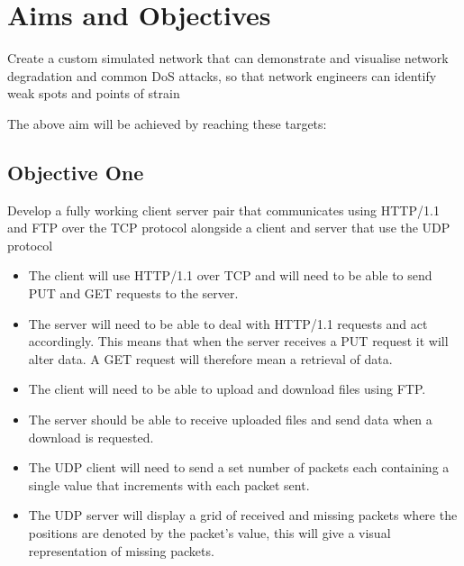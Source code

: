\chapter{Aims and Objectives}
\begin{center}
Create a custom simulated network that can demonstrate and visualise network degradation and common DoS attacks, so that network engineers can identify weak spots and points of strain
\end{center}


The above aim will be achieved by reaching these targets:

\section{Objective One}
\label{ref:obj1}
Develop a fully working client server pair that communicates using HTTP/1.1 \citep{HTTP} and FTP over the TCP protocol alongside a client and server that use the UDP protocol

\begin{itemize}
\item The client will use HTTP/1.1  over TCP and will need to be able to send PUT and GET requests to the server.
\item The server will need to be able to deal with HTTP/1.1 requests and act accordingly. This means that when the server receives a PUT request it will alter data. A GET request will therefore mean a retrieval of data. 
\item The client will need to be able to upload and download files using FTP.
\item The server should be able to receive uploaded files and send data when a download is requested.
\item The UDP client will need to send a set number of packets each containing a single value that increments with each packet sent.
\item The UDP server will display a grid of received and missing packets where the positions are denoted by the packet's value, this will give a visual representation of missing packets.
\end{itemize}  

